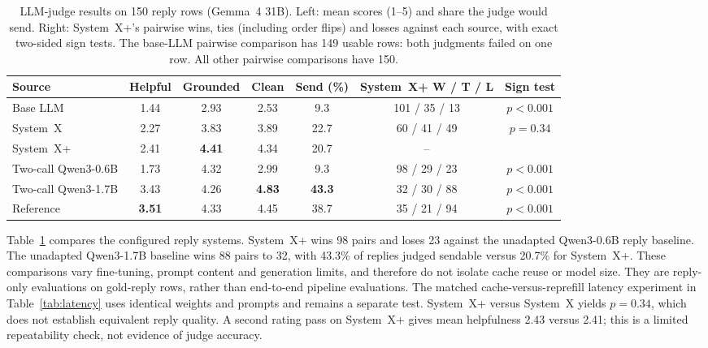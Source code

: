 \documentclass[11pt]{article}
\newcommand{\sysplus}{System~X+}
\begin{document}
\begin{table}[t]
\centering
\caption{LLM-judge results on 150 reply rows (Gemma~4 31B). Left: mean scores (1--5) and share the judge would send. Right: \sysplus{}'s pairwise wins, ties (including order flips) and losses against each source, with exact two-sided sign tests. The base-LLM pairwise comparison has 149 usable rows: both judgments failed on one row. All other pairwise comparisons have 150.}
\label{tab:judge}
\small
\setlength{\tabcolsep}{4pt}
\begin{tabular}{lcccc|cc}
\toprule
Source & Helpful & Grounded & Clean & Send (\%) & \sysplus{} W / T / L & Sign test \\
\midrule
Base LLM & 1.44 & 2.93 & 2.53 & 9.3 & 101 / 35 / 13 & $p<0.001$ \\
System~X & 2.27 & 3.83 & 3.89 & 22.7 & 60 / 41 / 49 & $p=0.34$ \\
\sysplus{} & 2.41 & \textbf{4.41} & 4.34 & 20.7 & -- & \\
Two-call Qwen3-0.6B & 1.73 & 4.32 & 2.99 & 9.3 & 98 / 29 / 23 & $p<0.001$ \\
Two-call Qwen3-1.7B & 3.43 & 4.26 & \textbf{4.83} & \textbf{43.3} & 32 / 30 / 88 & $p<0.001$ \\
Reference & \textbf{3.51} & 4.33 & 4.45 & 38.7 & 35 / 21 / 94 & $p<0.001$ \\
\bottomrule
\end{tabular}
\end{table}

Table~\ref{tab:judge} compares the configured reply systems. \sysplus{} wins 98 pairs and loses 23 against the unadapted Qwen3-0.6B reply baseline. The unadapted Qwen3-1.7B baseline wins 88 pairs to 32, with 43.3\% of replies judged sendable versus 20.7\% for \sysplus{}. These comparisons vary fine-tuning, prompt content and generation limits, and therefore do not isolate cache reuse or model size. They are reply-only evaluations on gold-reply rows, rather than end-to-end pipeline evaluations. The matched cache-versus-reprefill latency experiment in Table~\ref{tab:latency} uses identical weights and prompts and remains a separate test. \sysplus{} versus System~X yields $p=0.34$, which does not establish equivalent reply quality. A second rating pass on \sysplus{} gives mean helpfulness 2.43 versus 2.41; this is a limited repeatability check, not evidence of judge accuracy.
\end{document}
